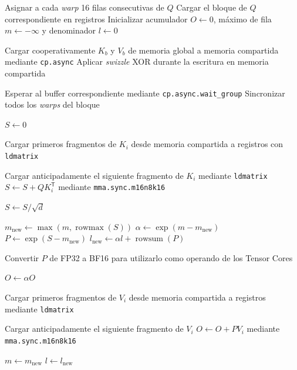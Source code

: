 \begin{algorithm}[H]
\caption{FlashAttention CUDA}
\footnotesize
\begin{algorithmic}[1]

\State Asignar a cada \textit{warp} 16 filas consecutivas de \(Q\)
\State Cargar el bloque de \(Q\) correspondiente en registros
\State Inicializar acumulador \(O \gets 0\), máximo de fila \(m \gets -\infty\) y denominador \(l \gets 0\)

\State Cargar cooperativamente \(K_b\) y \(V_b\) de memoria global a memoria compartida mediante \texttt{cp.async}
\State Aplicar \textit{swizzle} XOR durante la escritura en memoria compartida
\EndFor


\State Esperar al buffer correspondiente mediante \texttt{cp.async.wait\_group}
\State Sincronizar todos los \textit{warps} del bloque

\State \(S \gets 0\)

\State Cargar primeros fragmentos de \(K_i\) desde memoria compartida a registros con \texttt{ldmatrix}

    \State Cargar anticipadamente el siguiente fragmento de \(K_i\) mediante \texttt{ldmatrix}
    \State \(S \gets S + QK_i^\mathsf{T}\) mediante \texttt{mma.sync.m16n8k16}
\EndFor

\State \(S \gets S/\sqrt{d}\)

\State \(m_{\mathrm{new}} \gets \max(m,\operatorname{rowmax}(S))\)
\State \(\alpha \gets \exp(m-m_{\mathrm{new}})\)
\State \(P \gets \exp(S-m_{\mathrm{new}})\)
\State \(l_{\mathrm{new}} \gets \alpha l + \operatorname{rowsum}(P)\)

\State Convertir \(P\) de FP32 a BF16 para utilizarlo como operando de los Tensor Cores

\State \(O \gets \alpha O\)

\State Cargar primeros fragmentos de \(V_i\) desde memoria compartida a registros mediante \texttt{ldmatrix}

    \State Cargar anticipadamente el siguiente fragmento de \(V_i\)
    \State \(O \gets O + PV_i\) mediante \texttt{mma.sync.m16n8k16}
\EndFor

\State \(m \gets m_{\mathrm{new}}\)
\State \(l \gets l_{\mathrm{new}}\)


\end{algorithmic}
\end{algorithm}
